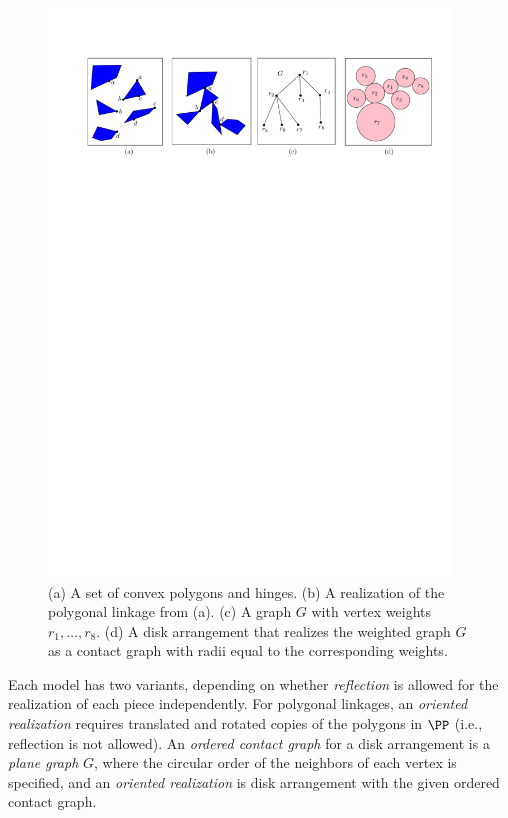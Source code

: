 \begin{figure}[htbp]
  \centering
 \includegraphics[width=0.95\textwidth]{graphics/fig1}
\caption{\small (a) A set of convex polygons and hinges. (b) A realization of the polygonal linkage from (a).
(c) A graph $G$ with vertex weights $r_1,\ldots , r_8$. (d) A disk arrangement that realizes the weighted graph $G$
 as a contact graph with radii equal to the corresponding weights.}
  \label{fig:1}
\end{figure}

Each model has two variants, depending on whether \emph{reflection} is allowed for the realization of each piece independently. For polygonal linkages, an \emph{oriented realization} requires translated and rotated copies of the polygons in $\PP$ (i.e., reflection is not allowed). An \emph{ordered contact graph} for a disk arrangement is a \emph{plane graph} $G$, where the circular order of the neighbors of each vertex is specified, and an \emph{oriented realization} is disk arrangement with the given ordered contact graph.

